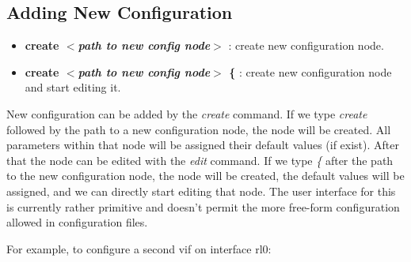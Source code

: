 \documentclass[11pt]{article}
\begin{document}
\newpage
\subsection{Adding New Configuration}
\begin{itemize}

\item \textbf{create $<$\textit{path to new config node}$>$}
: create new configuration node.
\item \textbf{create $<$\textit{path to new config node}$>$ \{}
: create new configuration node and start editing it.

\end{itemize}

New configuration can be added by the \emph{create} command.
If we type \emph{create} followed by the path to a new configuration node,
the node will be created. All parameters within that node will be assigned
their default values (if exist). After that the node can be edited with the
\emph{edit} command.
If we type \emph{\{} after the path to the new configuration node,
the node will be created, the default values will be assigned, and we can
directly start editing that node.
The user interface for this is currently rather
primitive and doesn't permit the more free-form configuration allowed
in configuration files.

For example, to configure a second vif on interface rl0:
\vspace{0.1in}
\end{document}
